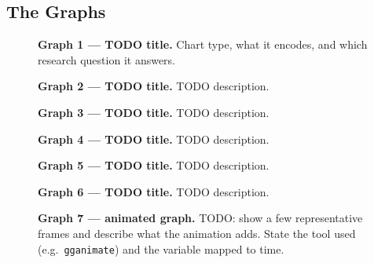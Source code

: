 \subsection{The Graphs}
\label{sec:graphs}


\begin{figure}[H]
\centering
\caption{\textbf{Graph 1 --- TODO title.} Chart type, what it encodes, and which
research question it answers.}
\label{fig:g1}
\end{figure}

\begin{figure}[H]
\centering
{}
\caption{\textbf{Graph 2 --- TODO title.} TODO description.}
\label{fig:g2}
\end{figure}

\begin{figure}[H]
\centering
{}
\caption{\textbf{Graph 3 --- TODO title.} TODO description.}
\label{fig:g3}
\end{figure}

\begin{figure}[H]
\centering
{}
\caption{\textbf{Graph 4 --- TODO title.} TODO description.}
\label{fig:g4}
\end{figure}

\begin{figure}[H]
\centering
{}
\caption{\textbf{Graph 5 --- TODO title.} TODO description.}
\label{fig:g5}
\end{figure}

\begin{figure}[H]
\centering
{}
\caption{\textbf{Graph 6 --- TODO title.} TODO description.}
\label{fig:g6}
\end{figure}

\begin{figure}[H]
\centering
{}
\caption{\textbf{Graph 7 --- animated graph.} TODO: show a few representative
frames and describe what the animation adds. State the tool used
(e.g.\ \texttt{gganimate}) and the variable mapped to time.}
\label{fig:g7}
\end{figure}

